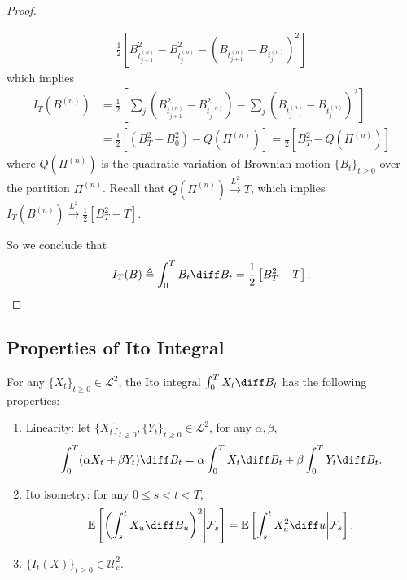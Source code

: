 \begin{proof}
\begin{enumerate}
\begin{align*}
\frac{1}{2}\left[
B_{t_{j+1}^{(n)}}^2-B_{t_j^{(n)}}^2-\left(
B_{t_{j+1}^{(n)}}-B_{t_j^{(n)}}
\right)^2
\right]
\end{align*}
which implies
\begin{align*}
I_T(B^{(n)})&=\frac{1}{2}\left[
\sum_j(B_{t_{j+1}^{(n)}}^2-B_{t_j^{(n)}}^2)-\sum_j\left(
B_{t_{j+1}^{(n)}}-B_{t_j^{(n)}}
\right)^2
\right]\\
&=\frac{1}{2}\left[
(B_T^2-B_0^2)-Q(\Pi^{(n)})
\right]=\frac{1}{2}\left[
B_T^2-Q(\Pi^{(n)})
\right]
\end{align*}
where $Q(\Pi^{(n)})$ is the quadratic variation of Brownian motion $\{B_t\}_{t\ge0}$ over the partition $\Pi^{(n)}$.
Recall that $Q(\Pi^{(n)})\xrightarrow{L^2}T$, which implies $I_T(B^{(n)})\xrightarrow{L^2}\frac{1}{2}\left[
B_T^2-T
\right]$.
\end{enumerate}
So we conclude that
\[
I_T(B)\triangleq \int_0^TB_t\diff B_t=\frac{1}{2}\left[
B_T^2-T
\right].
\]
\end{proof}

\subsection{Properties of Ito Integral}

\begin{proposition}
For any $\{X_t\}_{t\ge0}\in\mathcal{L}^2$, the Ito integral $\int_0^TX_t\diff B_t$ has the following properties:
\begin{enumerate}
\item
Linearity: let $\{X_t\}_{t\ge0},\{Y_t\}_{t\ge0}\in\mathcal{L}^2$, for any $\alpha,\beta$,
\[
\int_0^T(\alpha X_t + \beta Y_t)\diff B_t = \alpha \int_0^TX_t\diff B_t+\beta \int_0^TY_t\diff B_t.
\]
\item
Ito isometry: for any $0\le s<t<T$,
\[
\mathbb{E}\left[
\left(
\int_s^tX_u\diff B_u
\right)^2\middle|\mathcal{F}_s
\right]=\mathbb{E}\left[
\int_s^tX_u^2\diff u
\middle|\mathcal{F}_s
\right].
\]
\item
$\{I_t(X)\}_{t\ge0}\in\mathcal{U}_c^2$.
\end{enumerate}
\end{proposition}

